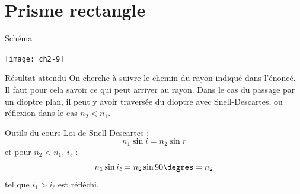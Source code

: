 \documentclass[../main/main.tex]{subfiles}
\begin{document}
\section{Prisme rectangle}
\begin{tcbraster}[raster columns=3, raster equal height=rows]
    \begin{NCdefi}[raster multicolumn=2]{Schéma}
        \begin{center}
            \texttt{[image: ch2-9]}
        \end{center}
    \end{NCdefi}
    \begin{tcolorbox}[blankest, raster multicolumn=1, space to=\myspace]
        \begin{tcbraster}[raster columns=1]
            \begin{NCprop}[]{Résultat attendu}
                On cherche à suivre le chemin du rayon indiqué dans l'énoncé. Il
                faut pour cela savoir ce qui peut arriver au rayon. Dans le cas
                du passage par un dioptre plan, il peut y avoir traversée du
                dioptre avec Snell-Descartes, ou réflexion dans le cas $n_2 <
                n_1$.
            \end{NCprop}
            \begin{NCdemo}{Outils du cours}
                Loi de Snell-Descartes :
                \[ n_1\sin i = n_2\sin r\]
                et pour $n_2 < n_1$, $i_\ell$ :
                \[ n_1\sin i_\ell = n_2\sin 90\degres = n_2\]
                tel que $i_1 > i_\ell$ est réfléchi.
            \end{NCdemo}
        \end{tcbraster}
    \end{tcolorbox}
\end{tcbraster}
\end{document}
